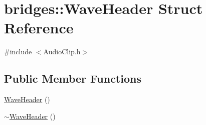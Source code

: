\hypertarget{structbridges_1_1_wave_header}{}\section{bridges\+:\+:Wave\+Header Struct Reference}
\label{structbridges_1_1_wave_header}


{\ttfamily \#include $<$Audio\+Clip.\+h$>$}

\subsection*{Public Member Functions}
\begin{DoxyCompactItemize}
\item 
\hyperlink{structbridges_1_1_wave_header_a5d6c15721015aeb83eab90e688306caa}{Wave\+Header} ()
\item 
\hyperlink{structbridges_1_1_wave_header_a34cca4a39fe95ef5bcd2f54082b62cea}{$\sim$\+Wave\+Header} ()
\end{DoxyCompactItemize}
